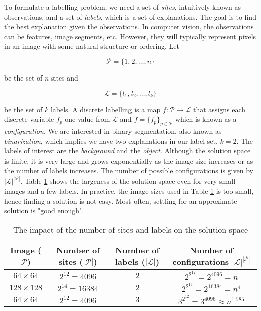 To formulate a labelling problem, we need a set of \textit{sites}, intuitively known as observations, and a set of \textit{labels}, which is a set of explanations.
The goal is to find the best explanation given the observations.
In computer vision, the observations can be features, image segments, etc.
However, they will typically represent pixels in an image with some natural structure or ordering.
Let 

\begin{equation*}
	\mathcal{P} = \{1, 2, \ldots, n\}
\end{equation*}

be the set of $n$ sites and 

\begin{equation*}
\mathcal{L} = \{l_1, l_2, \ldots, l_k\}
\end{equation*}

be the set of $k$ labels.
A discrete labelling is a map $f: \mathcal{P} \rightarrow \mathcal{L}$ that assigns each discrete variable $f_p$ one value from $\mathcal{L}$ and $f=\{f_p\}_{p \in \mathcal{P}}$ which is known as a \textit{configuration}.
We are interested in binary segmentation, also known as \textit{binarization}, which implies we have two explanations in our label set, $k=2$.
The labels of interest are the \textit{background} and the \textit{object}.
Although the solution space is finite, it is very large and grows exponentially as the image size increases or as the number of labels increases.
The number of possible configurations is given by $|\mathcal{L}|^{|\mathcal{P}|}$.
Table \ref{tab:configuration} shows the largeness of the solution space even for very small images and a few labels.
In practice, the image sizes used in Table \ref{tab:configuration} is too small, hence finding a solution is not easy.
Most often, settling for an approximate solution is "good enough".

\def\arraystretch{1.2}
\begin{table}[ht]
	\caption{The impact of the number of sites and labels on the solution space}
	\label{tab:configuration}
	\begin{tabular}{|c|c|c|c|}
		\hline 
		Image ($\mathcal{P}$) & Number of sites ($|\mathcal{P}|$) & Number of labels ($|\mathcal{L}|$) & Number of configurations $|\mathcal{L}|^{|\mathcal{P}|}$ \\ 
		\hline 
		$64 \times 64$ & $2^{12}=4096$ & $2$ & $2^{2^{12}} = 2^{4096}=n$ \\
		\hline 
		$128 \times 128$ & $2^{14}=16384$ & $2$ & $2^{2^{14}} = 2^{16384} = n^4$ \\ 
		\hline 
		$64 \times 64$ & $2^{12}=4096$ & $3$ & $3^{2^{12}} = 3^{4096} \approx n^{1.585}$ \\ 
		\hline 
	\end{tabular}
\end{table}
 

